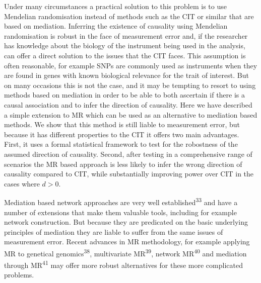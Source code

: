 \documentclass[]{article}
\begin{document}
Under many circumstances a practical solution to this problem is to use
Mendelian randomisation instead of methods such as the CIT or similar
that are based on mediation. Inferring the existence of causality using
Mendelian randomisation is robust in the face of measurement error and,
if the researcher has knowledge about the biology of the instrument
being used in the analysis, can offer a direct solution to the issues
that the CIT faces. This assumption is often reasonable, for example
SNPs are commonly used as instruments when they are found in genes with
known biological relevance for the trait of interest. But on many
occasions this is not the case, and it may be tempting to resort to
using methods based on mediation in order to be able to both ascertain
if there is a causal association and to infer the direction of
causality. Here we have described a simple extension to MR which can be
used as an alternative to mediation based methods. We show that this
method is still liable to measurement error, but because it has
different properties to the CIT it offers two main advantages. First, it
uses a formal statistical framework to test for the robostness of the
assumed direction of causality. Second, after testing in a comprehensive
range of scenarios the MR based approach is less likely to infer the
wrong direction of causality compared to CIT, while substantially
improving power over CIT in the cases where \(d > 0\).

Mediation based network approaches are very well
established\textsuperscript{33} and have a number of extensions that
make them valuable tools, including for example network construction.
But because they are predicated on the basic underlying principles of
mediation they are liable to suffer from the same issues of measurement
error. Recent advances in MR methodology, for example applying MR to
genetical genomics\textsuperscript{38}, multivariate
MR\textsuperscript{39}, network MR\textsuperscript{40} and mediation
through MR\textsuperscript{41} may offer more robust alternatives for
these more complicated problems.
\end{document}

